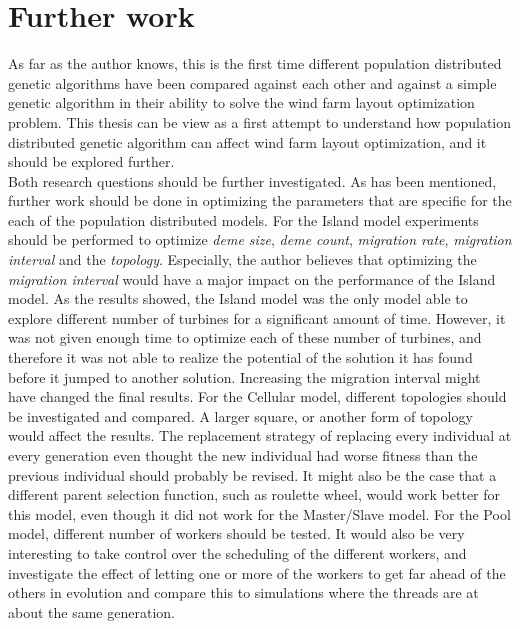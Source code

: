 \section{Further work}\label{section:further work}
As far as the author knows, this is the first time different population distributed genetic algorithms have been compared against each other and against a simple genetic algorithm in their ability to solve the wind farm layout optimization problem. This thesis can be view as a first attempt to understand how population distributed genetic algorithm can affect wind farm layout optimization, and it should be explored further.\\


\noindent Both research questions should be further investigated. As has been mentioned, further work should be done in optimizing the parameters that are specific for the each of the population distributed models. For the Island model experiments should be performed to optimize \textit{deme size}, \textit{deme count}, \textit{migration rate}, \textit{migration interval} and the \textit{topology}. Especially, the author believes that optimizing the \textit{migration interval} would have a major impact on the performance of the Island model. As the results showed, the Island model was the only model able to explore different number of turbines for a significant amount of time. However, it was not given enough time to optimize each of these number of turbines, and therefore it was not able to realize the potential of the solution it has found before it jumped to another solution. Increasing the migration interval might have changed the final results. For the Cellular model, different topologies should be investigated and compared. A larger square, or another form of topology would affect the results. The replacement strategy of replacing every individual at every generation even thought the new individual had worse fitness than the previous individual should probably be revised. It might also be the case that a different parent selection function, such as roulette wheel, would work better for this model, even though it did not work for the Master/Slave model. For the Pool model, different number of workers should be tested. It would also be very interesting to take control over the scheduling of the different workers, and investigate the effect of letting one or more of the workers to get far ahead of the others in evolution and compare this to simulations where the threads are at about the same generation. \\


